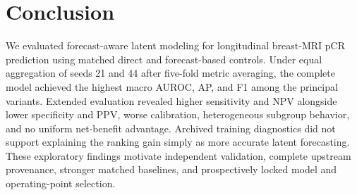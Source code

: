 \section{Conclusion}
We evaluated forecast-aware latent modeling for longitudinal breast-MRI pCR prediction using matched direct and forecast-based controls. Under equal aggregation of seeds 21 and 44 after five-fold metric averaging, the complete model achieved the highest macro AUROC, AP, and F1 among the principal variants. Extended evaluation revealed higher sensitivity and NPV alongside lower specificity and PPV, worse calibration, heterogeneous subgroup behavior, and no uniform net-benefit advantage. Archived training diagnostics did not support explaining the ranking gain simply as more accurate latent forecasting. These exploratory findings motivate independent validation, complete upstream provenance, stronger matched baselines, and prospectively locked model and operating-point selection.

